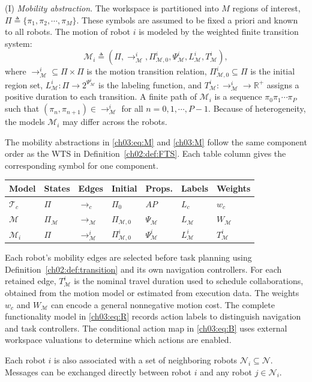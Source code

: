 (I) \emph{Mobility abstraction}.
The workspace is partitioned into $M$ regions of interest,
$\Pi \triangleq \{\pi_1,\pi_2,\cdots,\pi_M\}$. These symbols are assumed to be
fixed a priori and known to all robots. The motion of robot $i$ is modeled by
the weighted finite transition system:
\begin{equation}
\label{ch03:M}
\mathcal{M}_i \triangleq
(\Pi, \longrightarrow_{\mathcal{M}}^i, \Pi_{\mathcal{M},0}^i,
 \Psi_{\mathcal{M}}^i, L_{\mathcal{M}}^i, T_{\mathcal{M}}^i),
\end{equation}
where $\longrightarrow_{\mathcal{M}}^i \subseteq \Pi \times \Pi$ is the motion
transition relation, $\Pi_{\mathcal{M},0}^i \subseteq \Pi$ is the initial
region set, $L_{\mathcal{M}}^i : \Pi \rightarrow 2^{\Psi_{\mathcal{M}}^i}$ is
the labeling function, and
$T_{\mathcal{M}}^i : \longrightarrow_{\mathcal{M}}^i \rightarrow \mathbb{R}^+$
assigns a positive duration to each transition. A finite path of
$\mathcal{M}_i$ is a sequence $\pi_0 \pi_1 \cdots \pi_P$ such that
$(\pi_n,\pi_{n+1}) \in \longrightarrow_{\mathcal{M}}^i$ for all
$n = 0,1,\cdots,P-1$. Because of heterogeneity, the models $\mathcal{M}_i$ may
differ across the robots.

\begin{revision}
The mobility abstractions in \eqref{ch03:eq:M} and \eqref{ch03:M} follow the
same component order as the WTS in Definition~\ref{ch02:def:FTS}.
Each table column gives the corresponding symbol for one component.
\begin{center}
\small
\begin{tabularx}{\textwidth}{lXXXXXX}
\toprule
Model & States & Edges & Initial & Props. & Labels & Weights \\
\midrule
$\mathcal{T}_c$ & $\Pi$ & $\to_c$ & $\Pi_0$ & $AP$ & $L_c$ & $w_c$ \\
$\mathcal{M}$ & $\Pi_{\mathcal{M}}$ & $\to_{\mathcal{M}}$ & $\Pi_{\mathcal{M},0}$ & $\Psi_{\mathcal{M}}$ & $L_{\mathcal{M}}$ & $W_{\mathcal{M}}$ \\
$\mathcal{M}_i$ & $\Pi$ & $\to_{\mathcal{M}}^i$ & $\Pi_{\mathcal{M},0}^i$ & $\Psi_{\mathcal{M}}^i$ & $L_{\mathcal{M}}^i$ & $T_{\mathcal{M}}^i$ \\
\bottomrule
\end{tabularx}
\end{center}
Each robot's mobility edges are selected before task planning using
Definition~\ref{ch02:def:transition} and its own navigation controllers.
For each retained edge, $T_{\mathcal{M}}^i$ is the nominal travel duration
used to schedule collaborations, obtained from the motion model or estimated
from execution data. The weights $w_c$ and $W_{\mathcal{M}}$ can encode a general
nonnegative motion cost. The complete functionality model in
\eqref{ch03:eq:R} records action labels to distinguish navigation and task
controllers. The conditional action map in \eqref{ch03:eq:B} uses external
workspace valuations to determine which actions are enabled.
\end{revision}
Each robot $i$ is also associated with a set of neighboring robots
$\mathcal{N}_i \subseteq \mathcal{N}$. Messages can be exchanged directly
between robot $i$ and any robot $j \in \mathcal{N}_i$.

